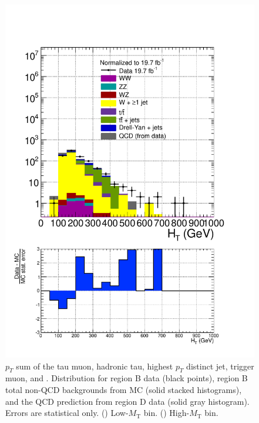 \begin{figure}[hbtp]
\begin{center}
    \includegraphics[width=\cmsFigWidth]{figures/dataVsMCQCD_HT_highMT_v87}
    \caption{$p_T$ sum of the tau muon, hadronic tau, highest $p_T$ distinct jet, trigger muon, and \ETslash. Distribution for region B data (black points), region B total non-QCD backgrounds from MC (solid stacked histograms), and the QCD prediction from region D data (solid gray histogram).  Errors are statistical only. (\cmsLeft) Low-$M_{\text{T}}$ bin. (\cmsRight) High-$M_{\text{T}}$ bin.}
    \label{fig:regB-data-MC-tauMuTauHadJetWMuMETHT}
  \end{center}
\end{figure}

